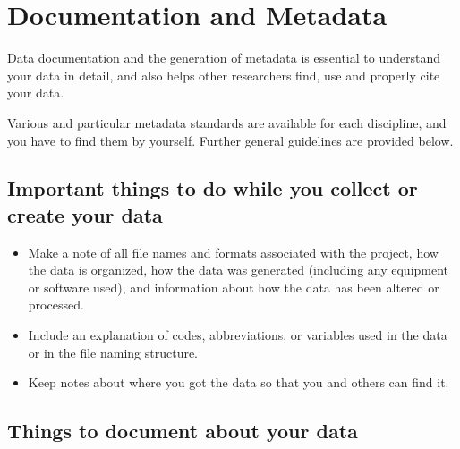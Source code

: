 \section{Documentation and Metadata}

Data documentation and the generation of metadata is essential to understand
your data in detail, and also helps other researchers find, use and properly
cite your data.


Various and particular metadata standards are available for each discipline, and
you have to find them by yourself. Further general guidelines are provided below.

\subsection{Important things to do while you collect or create your data}

\begin{itemize}
  \item Make a note of all file names and formats associated with the project,
        how the data is organized, how the data was generated (including any
        equipment or software used), and information about how the data has been
        altered or processed.
  \item Include an explanation of codes, abbreviations, or variables used in the
        data or in the file naming structure.
  \item Keep notes about where you got the data so that you and others
        can find it.
\end{itemize}

\subsection{Things to document about your data}\label{sc:data-documentation}

